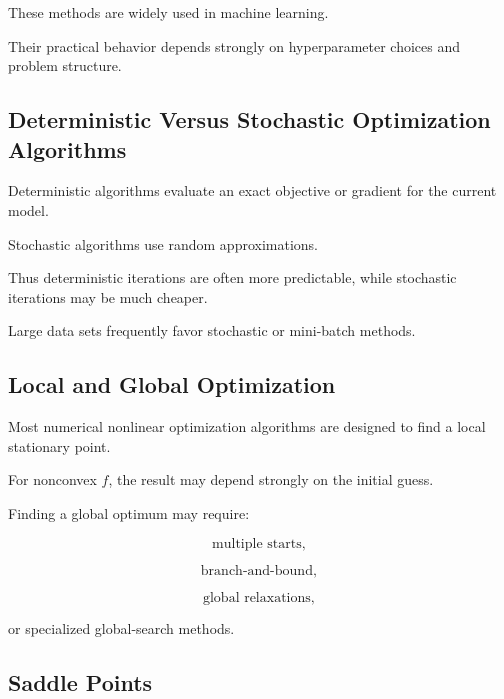 These methods are widely used in machine learning.

Their practical behavior depends strongly on hyperparameter choices and
problem structure.

\subsection{Deterministic Versus Stochastic Optimization Algorithms}
\label{subsec:deterministic-versus-stochastic-algorithms}

Deterministic algorithms evaluate an exact objective or gradient for the
current model.

Stochastic algorithms use random approximations.

Thus deterministic iterations are often more predictable, while
stochastic iterations may be much cheaper.

Large data sets frequently favor stochastic or mini-batch methods.

\subsection{Local and Global Optimization}
\label{subsec:local-global-numerical-optimization}

Most numerical nonlinear optimization algorithms are designed to find a
local stationary point.

For nonconvex \(f\), the result may depend strongly on the initial guess.

Finding a global optimum may require:

\[
\boxed{
\text{multiple starts},
}
\]

\[
\boxed{
\text{branch-and-bound},
}
\]

\[
\boxed{
\text{global relaxations},
}
\]

or specialized global-search methods.

\subsection{Saddle Points}
\label{subsec:optimization-saddle-points}

